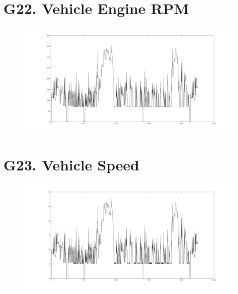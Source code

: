 \documentclass{article}
\begin{document}
\section*{G22. Vehicle Engine RPM }
\begin{figure}[h!]
 \begin{center}
 \advance\leftskip-6cm
  \includegraphics[width=230mm,scale=0.7]{g22s2.jpg}
\end{center}
\end{figure}
\newpage
\section*{G23. Vehicle Speed }
\begin{figure}[h!]
 \begin{center}
 \advance\leftskip-6cm
  \includegraphics[width=230mm,scale=0.7]{g23s2.jpg}
\end{center}
\end{figure}
\newpage
\end{document}
